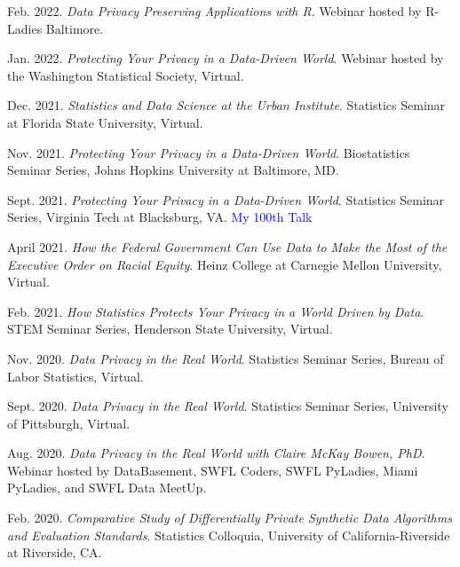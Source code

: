 \documentclass[11pt, letterpaper, roman]{moderncv} %
\begin{document}
\begin{etaremune}[topsep=0pt, itemsep=4pt, partopsep=0pt, parsep=0pt]
    \item Feb. 2022. \textit{Data Privacy Preserving Applications with R}. Webinar hosted by R-Ladies Baltimore.

    \item Jan. 2022. \textit{Protecting Your Privacy in a Data-Driven World}. Webinar hosted by the Washington Statistical Society, Virtual.
    
    \item Dec. 2021. \textit{Statistics and Data Science at the Urban Institute}. Statistics Seminar at Florida State University, Virtual.
    
    \item Nov. 2021. \textit{Protecting Your Privacy in a Data-Driven World}. Biostatistics Seminar Series, Johns Hopkins University at Baltimore, MD.
    
    \item Sept. 2021. \textit{Protecting Your Privacy in a Data-Driven World}. Statistics Seminar Series, Virginia Tech at Blacksburg, VA. \textcolor{blue}{My 100th Talk}
    
    \item April 2021. \textit{How the Federal Government Can Use Data to Make the Most of the Executive Order on Racial Equity}. Heinz College at Carnegie Mellon University, Virtual.

    \item Feb. 2021. \textit{How Statistics Protects Your Privacy in a World Driven by Data}. STEM Seminar Series, Henderson State University, Virtual.

    \item Nov. 2020. \textit{Data Privacy in the Real World}. Statistics Seminar Series, Bureau of Labor Statistics, Virtual.

    \item Sept. 2020. \textit{Data Privacy in the Real World}. Statistics Seminar Series, University of Pittsburgh, Virtual.
        
    \item Aug. 2020. \textit{Data Privacy in the Real World with Claire McKay Bowen, PhD}. Webinar hosted by DataBasement, SWFL Coders, SWFL PyLadies, Miami PyLadies, and SWFL Data MeetUp.
    
    \item Feb. 2020. \textit{Comparative Study of Differentially Private Synthetic Data Algorithms and Evaluation Standards}. Statistics Colloquia, University of California-Riverside at Riverside, CA.
    

\end{etaremune}
\end{document}
